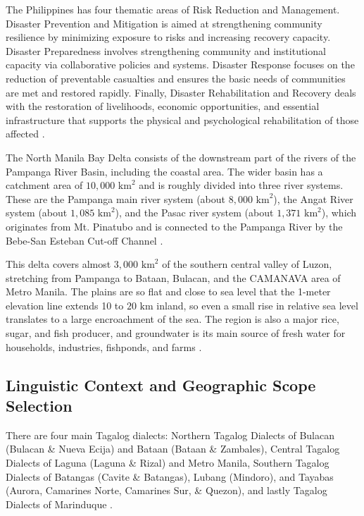 The Philippines has four thematic areas of Risk Reduction and Management.
Disaster Prevention and Mitigation is aimed at strengthening community
resilience by minimizing exposure to risks and increasing recovery capacity.
Disaster Preparedness involves strengthening community and institutional
capacity via collaborative policies and systems. Disaster Response focuses on
the reduction of preventable casualties and ensures the basic needs of
communities are met and restored rapidly. Finally, Disaster Rehabilitation and
Recovery deals with the restoration of livelihoods, economic opportunities, and
essential infrastructure that supports the physical and psychological
rehabilitation of those affected \parencite{inferio2025}.

The North Manila Bay Delta consists of the downstream part of the rivers of the Pampanga River Basin, including the coastal area. The wider basin has a catchment area of $10,000\text{ km}^2$ and is roughly divided into three river systems. These are the Pampanga main river system (about $8,000\text{ km}^2$), the Angat River system (about $1,085\text{ km}^2$), and the Pasac river system (about $1,371\text{ km}^2$), which originates from Mt. Pinatubo and is connected to the Pampanga River by the Bebe-San Esteban Cut-off Channel \parencite{rhdhv2026northmanilabay}.

This delta covers almost $3,000\text{ km}^2$ of the southern central valley of Luzon, stretching from Pampanga to Bataan, Bulacan, and the CAMANAVA area of Metro Manila. The plains are so flat and close to sea level that the 1-meter elevation line extends 10 to $20\text{ km}$ inland, so even a small rise in relative sea level translates to a large encroachment of the sea. The region is also a major rice, sugar, and fish producer, and groundwater is its main source of fresh water for households, industries, fishponds, and farms \parencite{Rodolfo2003}.

\subsection*{Linguistic Context and Geographic Scope Selection}

There are four main Tagalog dialects: Northern Tagalog Dialects of Bulacan (Bulacan \& Nueva Ecija) and Bataan (Bataan \& Zambales), Central Tagalog Dialects of Laguna (Laguna \& Rizal) and Metro Manila, Southern Tagalog Dialects of Batangas (Cavite \& Batangas), Lubang (Mindoro), and Tayabas (Aurora, Camarines Norte, Camarines Sur, \& Quezon), and lastly Tagalog Dialects of Marinduque \parencite{Adriano2022}.

